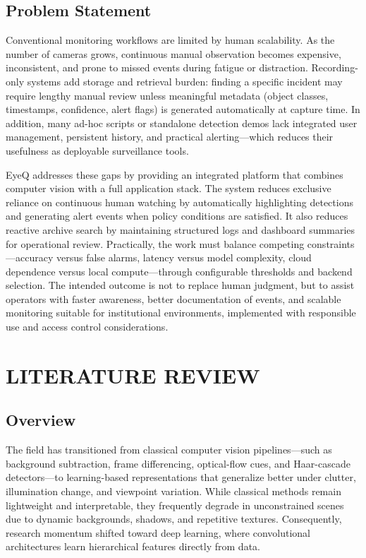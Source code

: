 \documentclass[10pt,openany]{report}
\begin{document}
\begin{sloppypar}
{{{\begin{sloppypar}
\section{Problem Statement}
Conventional monitoring workflows are limited by human scalability. As the number of cameras grows, continuous manual observation becomes expensive, inconsistent, and prone to missed events during fatigue or distraction. Recording-only systems add storage and retrieval burden: finding a specific incident may require lengthy manual review unless meaningful metadata (object classes, timestamps, confidence, alert flags) is generated automatically at capture time. In addition, many ad-hoc scripts or standalone detection demos lack integrated user management, persistent history, and practical alerting---which reduces their usefulness as deployable surveillance tools.

EyeQ addresses these gaps by providing an integrated platform that combines computer vision with a full application stack. The system reduces exclusive reliance on continuous human watching by automatically highlighting detections and generating alert events when policy conditions are satisfied. It also reduces reactive archive search by maintaining structured logs and dashboard summaries for operational review. Practically, the work must balance competing constraints---accuracy versus false alarms, latency versus model complexity, cloud dependence versus local compute---through configurable thresholds and backend selection. The intended outcome is not to replace human judgment, but to assist operators with faster awareness, better documentation of events, and scalable monitoring suitable for institutional environments, implemented with responsible use and access control considerations.

\newpage
\chapter{LITERATURE REVIEW}

\section*{Overview}
The field has transitioned from classical computer vision pipelines---such as background subtraction, frame differencing, optical-flow cues, and Haar-cascade detectors---to learning-based representations that generalize better under clutter, illumination change, and viewpoint variation. While classical methods remain lightweight and interpretable, they frequently degrade in unconstrained scenes due to dynamic backgrounds, shadows, and repetitive textures. Consequently, research momentum shifted toward deep learning, where convolutional architectures learn hierarchical features directly from data.


\end{sloppypar}}}}
\end{sloppypar}
\end{document}
